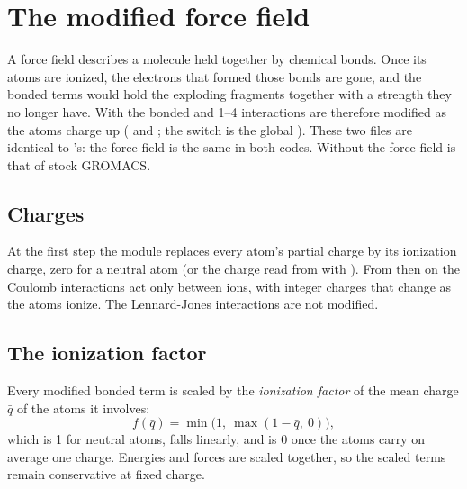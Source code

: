 \chapter{The modified force field}
\label{ch:ff}

A force field describes a molecule held together by chemical bonds.
Once its atoms are ionized, the electrons that formed those bonds are gone, and the bonded terms would hold the
exploding fragments together with a strength they no longer have.
With  the bonded and 1--4 interactions are therefore modified as the atoms charge up
( and ; the switch is the global
).
These two files are identical to 's: the force field is the same in both codes.
Without  the force field is that of stock GROMACS.

\section{Charges}

At the first step the module replaces every atom's partial charge by its ionization charge, zero for a neutral atom
(or the charge read from  with ).
From then on the Coulomb interactions act only between ions, with integer charges that change as the atoms ionize.
The Lennard-Jones interactions are not modified.

\section{The ionization factor}

Every modified bonded term is scaled by the \emph{ionization factor} of the mean charge $\bar q$ of the atoms it
involves:
\begin{equation}
  f(\bar q) = \min\!\big(1,\ \max(1-\bar q,\ 0)\big),
\end{equation}
which is 1 for neutral atoms, falls linearly, and is 0 once the atoms carry on average one charge.
Energies and forces are scaled together, so the scaled terms remain conservative at fixed charge.

